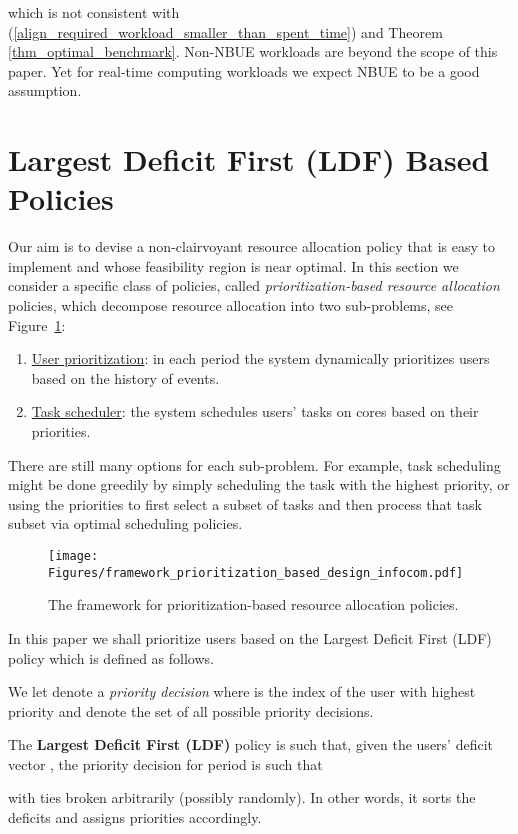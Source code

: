 \documentclass[prodmode,acmtompecs]{acmsmall}
\newcommand{\myComments}[1]{}
\newif\ifdissertation
\newcommand{\dissertationStart}{\ifdissertation  \myComments{Dissertation version: }}
\newcommand{\commentEnd}{\myComments{End}}
\begin{document}
which is not consistent with (\ref{align_required_workload_smaller_than_spent_time}) and Theorem \ref{thm_optimal_benchmark}. 
Non-NBUE workloads are beyond the scope of this paper. Yet for real-time computing workloads we expect NBUE to be a good assumption. 
\commentEnd\fi


\section{Largest Deficit First (LDF) Based Policies}
Our aim is to devise a non-clairvoyant resource allocation policy that is easy to implement and whose feasibility region is near optimal. 
In this section we consider a specific class of policies, called {\em prioritization-based resource allocation} policies, which decompose resource allocation into two sub-problems, see Figure~{\ref{fig_prioritization_based_framework}}: 
\begin{enumerate}
\item \underline{User prioritization}: in each period the system dynamically prioritizes users based on the history of events. 
\item \underline{Task scheduler}: the system schedules users' tasks on cores based on their priorities. 
\end{enumerate}
There are still many options for each sub-problem. 
For example, task scheduling might be done greedily by simply scheduling the task with the highest priority, or using the priorities to first select a subset of tasks and then process that task subset via optimal scheduling policies. 

\begin{figure}[htp]
  \centering
  \texttt{[image: Figures/framework\_prioritization\_based\_design\_infocom.pdf]}
  \caption{The framework for prioritization-based resource allocation policies. }
  \label{fig_prioritization_based_framework}
\end{figure}

In this paper we shall prioritize users based on the Largest Deficit First (LDF) policy which is defined as follows. 

We let  denote a {\em priority decision} where  is the index of the user with  highest priority and  denote the set of all possible priority decisions.
\dissertationStart
and let  be the number of possible decisions. We shall assume no restrictions on the set of allowable priority decisions, so 
\commentEnd\fi

\begin{definition}
\label{defn_w_LDF}
The {\bf Largest Deficit First (LDF)} policy is such that, given the users' deficit vector , the priority decision  for period  is such that

with ties broken arbitrarily (possibly randomly). In other words, it sorts the deficits and assigns priorities accordingly. 
\end{definition}
\end{document}
